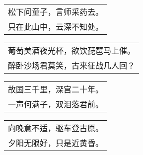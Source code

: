 \nopagebreak%
\nopagebreak%
\noindent\begin{minipage}{\linewidth}
  \vskip-3pt\begin{table}[H]
    \centering
    \begin{tabular}{@{}l@{}}
松下问童子，言师采药去。\\
只在此山中，云深不知处。
    \end{tabular}
  \end{table}
\end{minipage}
\vspace{1cm}


\nopagebreak%
\nopagebreak%
\noindent\begin{minipage}{\linewidth}
  \vskip-3pt\begin{table}[H]
    \centering
    \begin{tabular}{@{}l@{}}
葡萄美酒夜光杯，欲饮琵琶马上催。\\
醉卧沙场君莫笑，古来征战几人回？
    \end{tabular}
  \end{table}
\end{minipage}
\vspace{1cm}


\nopagebreak%
\nopagebreak%
\noindent\begin{minipage}{\linewidth}
  \vskip-3pt\begin{table}[H]
    \centering
    \begin{tabular}{@{}l@{}}
故国三千里，深宫二十年。\\
一声何满子，双泪落君前。
    \end{tabular}
  \end{table}
\end{minipage}
\vspace{1cm}


\nopagebreak%
\nopagebreak%
\noindent\begin{minipage}{\linewidth}
  \vskip-3pt\begin{table}[H]
    \centering
    \begin{tabular}{@{}l@{}}
向晚意不适，驱车登古原。\\
夕阳无限好，只是近黄昏。
    \end{tabular}
  \end{table}
\end{minipage}
\vspace{1cm}



